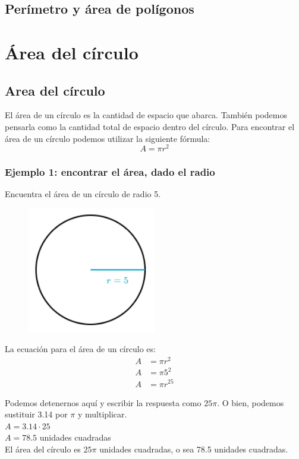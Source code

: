 \documentclass[11pt]{book}
\begin{document}
\subsection{Per\'imetro y \'area de pol\'igonos}

\section{\'Area del c\'irculo}


\subsection{Area del c\'irculo}
El área de un círculo es la cantidad de espacio que abarca. También podemos pensarla como la cantidad total de espacio dentro del círculo.
Para encontrar el área de un círculo podemos utilizar la siguiente fórmula:
\[A=\pi r^2\]

\subsubsection{Ejemplo 1: encontrar el área, dado el radio}
Encuentra el área de un círculo de radio 5.
\begin{figure}[H]
  \centering
  \includegraphics[width=0.5\textwidth]{./Unidad 2/Images/figS10_001.png}
\end{figure}
La ecuación para el área de un círculo es:
\begin{align*}
  A & = \pi r^2    \\
  A & = \pi 5^2    \\
  A & = \pi r^{25}
\end{align*}

Podemos detenernos aquí y escribir la respuesta como $25\pi$. O bien, podemos sustituir 3.14 por $\pi$ y multiplicar.\\
$A = 3.14 \cdot 25$\\
$A = 78.5$ unidades cuadradas\\
El área del círculo es $25\pi$ unidades cuadradas, o sea 78.5 unidades cuadradas.
\end{document}

